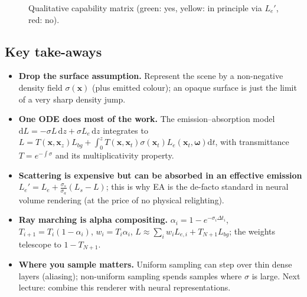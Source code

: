 \documentclass[11pt,a4paper]{article}
\newcommand{\x}{\bm{x}}
\newcommand{\w}{\bm{\omega}}
\theoremstyle{remark}\newtheorem*{remark}{Remark}
\begin{document}
\begin{figure}[h]
\centering
{}
\caption{Qualitative capability matrix (green: yes, yellow: in principle via $L_e'$, red: no).}\label{fig:matrix}
\end{figure}

\subsection{Key take-aways}
\begin{itemize}[leftmargin=1.4em]
 \item \textbf{Drop the surface assumption.} Represent the scene by a non-negative density field $\sigma(\x)$ (plus emitted colour); an opaque surface is just the limit of a very sharp density jump.
 \item \textbf{One ODE does most of the work.} The emission--absorption model $\mathrm dL=-\sigma L\,\mathrm dz+\sigma L_e\,\mathrm dz$ integrates to $L=T(\x,\x_z)L_{bg}+\int_0^zT(\x,\x_t)\sigma(\x_t)L_e(\x_t,\w)\mathrm dt$, with transmittance $T=e^{-\int\sigma}$ and its multiplicativity property.
 \item \textbf{Scattering is expensive but can be absorbed in an effective emission} $L_e'=L_e+\tfrac{\sigma_s}{\sigma_a}(L_s-L)$; this is why EA is the de-facto standard in neural volume rendering (at the price of no physical relighting).
 \item \textbf{Ray marching is alpha compositing.} $\alpha_i=1-e^{-\sigma_i\Delta t_i}$, $T_{i+1}=T_i(1-\alpha_i)$, $w_i=T_i\alpha_i$, $L\approx\sum_iw_iL_{e,i}+T_{N+1}L_{bg}$; the weights telescope to $1-T_{N+1}$.
 \item \textbf{Where you sample matters.} Uniform sampling can step over thin dense layers (aliasing); non-uniform sampling spends samples where $\sigma$ is large. Next lecture: combine this renderer with neural representations.
\end{itemize}
\end{document}
